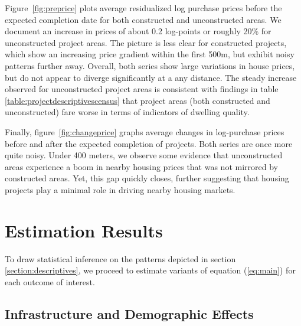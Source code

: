 \documentclass[12pt]{article}
\begin{document}
Figure~\ref{fig:preprice} plots average residualized log purchase prices before the expected completion date for both constructed and unconstructed areas. We document an increase in prices of about 0.2 log-points or roughly 20\% for unconstructed project areas. The picture is less clear for constructed projects, which show an increasing price gradient within the first 500m, but exhibit noisy patterns further away.  Overall, both series show large variations in house prices, but do not appear to diverge significantly at a any distance. The steady increase observed for unconstructed project areas is consistent with findings in table \ref{table:projectdescriptivescensus} that project areas (both constructed and unconstructed) fare worse in terms of indicators of dwelling quality.

Finally, figure~\ref{fig:changeprice} graphs average changes in log-purchase prices before and after the expected completion of projects. Both series are once more quite noisy. Under 400 meters, we observe some evidence that unconstructed areas experience a boom in nearby housing prices that was not mirrored by constructed areas.  Yet, this gap quickly closes, further suggesting that housing projects play a minimal role in driving nearby housing markets.


\section{Estimation Results}\label{section:results}

To draw statistical inference on the patterns depicted in section \ref{section:descriptives}, we proceed to estimate variants of equation (\ref{eq:main}) for each outcome of interest. 


\subsection{Infrastructure and Demographic Effects}\label{section:resultscensus}

\end{document}
